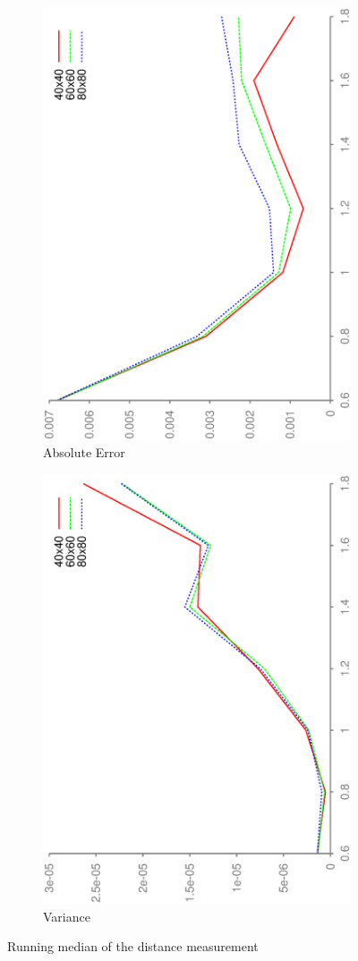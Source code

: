 \documentclass[DIV12,a4paper]{scrartcl}
\begin{document}
\begin{figure}[h!tbp]
  \centering
  \begin{subfigure}[b]{.5\textwidth}
    \centering
    \includegraphics[height=\textwidth, angle=270]{figures/mean_median10_error.eps}
    \caption{Absolute Error}
  \end{subfigure}%
  \begin{subfigure}[b]{.5\textwidth}
    \centering
    \includegraphics[height=\textwidth, angle=270]{figures/mean_median10_variance.eps}
    \caption{Variance}
  \end{subfigure}
  \caption{Running median of the distance measurement}
  \label{fig:median10_noise}
\end{figure}
\end{document}
